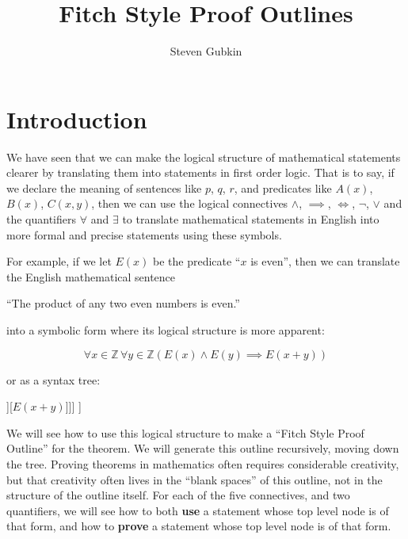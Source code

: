 \documentclass{article}
\title{Fitch Style Proof Outlines}
\author{Steven Gubkin}
\date{}
\newcommand{\equivalent}{\Longleftrightarrow}
\newcommand{\Z}{\mathbb{Z}}
\begin{document}
\maketitle

\section{Introduction}

We have seen that we can make the logical structure of mathematical statements clearer by translating them into statements in first order logic.  That is to say, if we declare the meaning of sentences like $p$, $q$, $r$,  and predicates like $A(x)$,  $B(x)$,  $C(x,y)$, then we can use the logical connectives $\wedge$, $\implies$, $\equivalent$, $\neg$, $\vee$ and the quantifiers $\forall$ and $\exists$ to translate mathematical statements in English into more formal and precise statements using these symbols.

For example, if we let $E(x)$ be the predicate ``$x$ is even'', then we can translate the English mathematical sentence 

{ \begin{center}
		``The product of any two even numbers is even.''
		\end{center}
}

into a symbolic form where its logical structure is more apparent:

$$
\forall x \in \Z \, \forall y \in \Z \left( E(x) \wedge E(y) \implies E(x+y) \right)
$$

or as a syntax tree:

\begin{center}
\begin{forest}
	[$\forall x \in \Z$[$\forall y \in \Z$[$\implies$[$\wedge$[$E(x)$][$E(y)$]][$E(x+y)$]]]
]
\end{forest}
\end{center}

We will see how to use this logical structure to make a ``Fitch Style Proof Outline''  for the theorem.  We will generate this outline recursively, moving down the tree.  Proving theorems in mathematics often requires considerable creativity, but that creativity often lives in the ``blank spaces'' of this outline, not in the structure of the outline itself.  For each of the five connectives, and two quantifiers, we will see how to both \textbf{use} a statement whose top level node is of that form, and how to \textbf{prove} a statement whose top level node is of that form.
\end{document}
